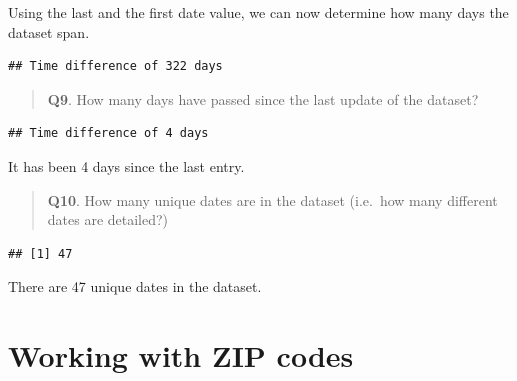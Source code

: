 \documentclass[
]{article}
\newenvironment{Shaded}{\begin{snugshade}}{\end{snugshade}}
\newcommand{\DecValTok}[1]{\textcolor[rgb]{0.00,0.00,0.81}{#1}}
\newcommand{\FunctionTok}[1]{\textcolor[rgb]{0.00,0.00,0.00}{#1}}
\newcommand{\NormalTok}[1]{#1}
\newcommand{\SpecialCharTok}[1]{\textcolor[rgb]{0.00,0.00,0.00}{#1}}
\begin{document}
Using the last and the first date value, we can now determine how many
days the dataset span.

\begin{Shaded}
\end{Shaded}

\begin{verbatim}
## Time difference of 322 days
\end{verbatim}

\begin{quote}
\textbf{Q9}. How many days have passed since the last update of the
dataset?
\end{quote}

\begin{Shaded}
\end{Shaded}

\begin{verbatim}
## Time difference of 4 days
\end{verbatim}

It has been 4 days since the last entry.

\begin{quote}
\textbf{Q10}. How many unique dates are in the dataset (i.e.~how many
different dates are detailed?)
\end{quote}

\begin{Shaded}
\end{Shaded}

\begin{verbatim}
## [1] 47
\end{verbatim}

There are 47 unique dates in the dataset.

\hypertarget{working-with-zip-codes}{%
\section{Working with ZIP codes}\label{working-with-zip-codes}}
\end{document}
